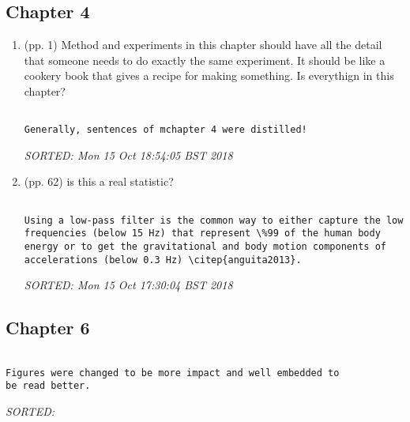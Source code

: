 \documentclass[10pt]{article}
\begin{document}
\subsection{Chapter 4}

\begin{enumerate}

\item (pp. 1) Method and experiments in this chapter should have all
	the detail that someone needs to do exactly the same experiment.
	It should be like a cookery book that gives a recipe for 
	making something. 
	Is everythign in this chapter?



\begin{verbatim}

Generally, sentences of mchapter 4 were distilled!

\end{verbatim}
\textit{
SORTED: 
Mon 15 Oct 18:54:05 BST 2018
}
\\



\item (pp. 62) is this a real statistic?


\begin{verbatim}

Using a low-pass filter is the common way to either capture the low 
frequencies (below 15 Hz) that represent \%99 of the human body 
energy or to get the gravitational and body motion components of 
accelerations (below 0.3 Hz) \citep{anguita2013}.

\end{verbatim}
\textit{
SORTED: 
Mon 15 Oct 17:30:04 BST 2018
}
\\





\end{enumerate}


\subsection{Chapter 6}



\begin{verbatim}

Figures were changed to be more impact and well embedded to
be read better.
\end{verbatim}
\textit{
SORTED: 
}
\\
\end{document}
